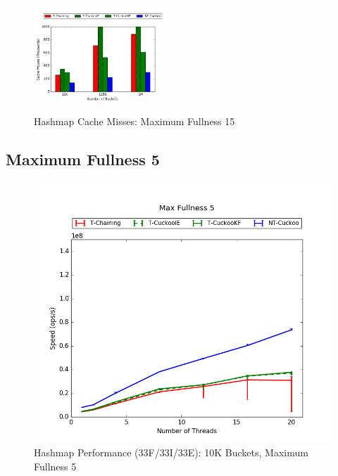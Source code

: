     \begin{figure}[H]
    \centering
        {\includegraphics[width=0.45\textwidth]{maps/3315cm.png}}
        \caption{Hashmap Cache Misses: Maximum Fullness 15}
    \end{figure}

\subsection{Maximum Fullness 5}

\begin{figure}[H]
    \centering
	\begin{minipage}{0.5\textwidth}\includegraphics[width=\textwidth]{maps/5HM10K:F34,I33,E33.png} 
    \end{minipage}
	\begin{minipage}{0.4\textwidth}
    
    \end{minipage}
    \caption{Hashmap Performance (33F/33I/33E): 10K Buckets, Maximum Fullness 5}
\end{figure}

